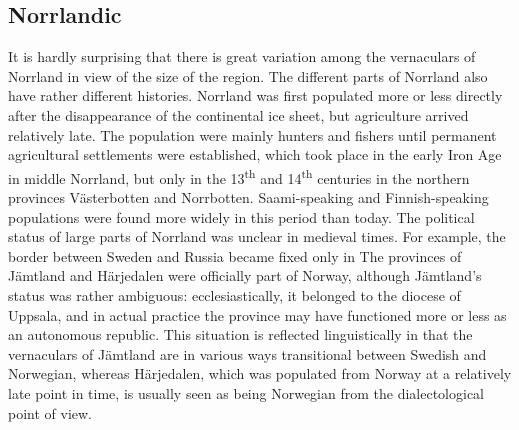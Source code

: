 
\subsection{ Norrlandic}

It is hardly surprising that there is great variation among the vernaculars of Norrland in view of the size of the region. The different parts of Norrland also have rather different histories. Norrland was first populated more or less directly after the disappearance of the continental ice sheet, but agriculture arrived relatively late. The population were mainly hunters and fishers until permanent agricultural settlements were established, which took place in the early Iron Age in middle Norrland, but only in the 13\textsuperscript{th} and 14\textsuperscript{th} centuries in the northern provinces Västerbotten and Norrbotten. Saami-speaking and Finnish-speaking populations were found more widely in this period than today. The political status of large parts of Norrland was unclear in medieval times. For example, the border between Sweden and Russia became fixed only in  The provinces of Jämtland and Härjedalen were officially part of Norway, although Jämtland’s status was rather ambiguous: ecclesiastically, it belonged to the diocese of Uppsala, and in actual practice the province may have functioned more or less as an autonomous republic. This situation is reflected linguistically in that the vernaculars of Jämtland are in various ways transitional between Swedish and Norwegian, whereas Härjedalen, which was populated from Norway at a relatively late point in time, is usually seen as being Norwegian from the dialectological point of view.


